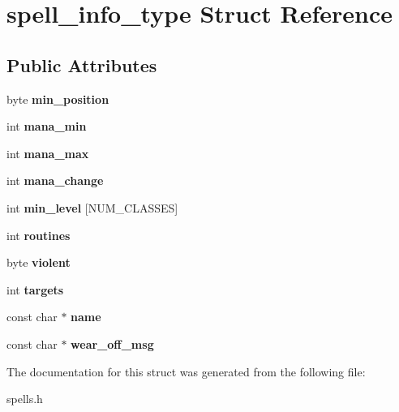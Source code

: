 \hypertarget{structspell__info__type}{}\section{spell\+\_\+info\+\_\+type Struct Reference}
\label{structspell__info__type}
\subsection*{Public Attributes}
\begin{DoxyCompactItemize}
\item 
\mbox{\label{structspell__info__type_a0271ab23067c3692eec21251e0fdbfeb}} 
byte {\bfseries min\+\_\+position}
\item 
\mbox{\label{structspell__info__type_a38a2557c4c54e72b364761b8fc377d82}} 
int {\bfseries mana\+\_\+min}
\item 
\mbox{\label{structspell__info__type_ae9c1eb9928a6277c686bc7df8b3034e8}} 
int {\bfseries mana\+\_\+max}
\item 
\mbox{\label{structspell__info__type_a8f5c21f2f9c33a3b1990af857c1e40ea}} 
int {\bfseries mana\+\_\+change}
\item 
\mbox{\label{structspell__info__type_a5bb6812eee8c9de98ed447df6e7a9178}} 
int {\bfseries min\+\_\+level} \mbox{[}N\+U\+M\+\_\+\+C\+L\+A\+S\+S\+ES\mbox{]}
\item 
\mbox{\label{structspell__info__type_aa108a535fb5959aed8c91d1d264334c7}} 
int {\bfseries routines}
\item 
\mbox{\label{structspell__info__type_a621d3e6643340895ee4f79ac763bcebf}} 
byte {\bfseries violent}
\item 
\mbox{\label{structspell__info__type_a8173d9e72793758a90a5c02d559809b9}} 
int {\bfseries targets}
\item 
\mbox{\label{structspell__info__type_a670b86593b5745b11e9afc9005a09825}} 
const char $\ast$ {\bfseries name}
\item 
\mbox{\label{structspell__info__type_a490a75387cce83cefe216b123480b3aa}} 
const char $\ast$ {\bfseries wear\+\_\+off\+\_\+msg}
\end{DoxyCompactItemize}


The documentation for this struct was generated from the following file\+:\begin{DoxyCompactItemize}
\item 
spells.\+h\end{DoxyCompactItemize}
